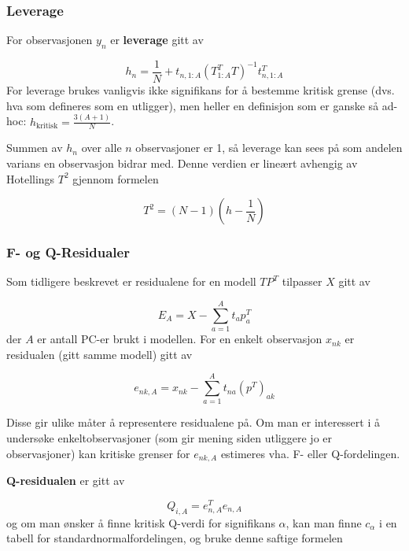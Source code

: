 \subsubsection{Leverage}
For observasjonen $y_n$ er \textbf{leverage} gitt av

\begin{equation}
	h_n = \frac{1}{N} + t_{n, 1:A} (T_{1:A}^T T)^{-1} t_{n, 1:A}^T
\end{equation}
For leverage brukes vanligvis ikke signifikans for å bestemme kritisk grense (dvs. hva som defineres som en utligger), men heller en definisjon som er ganske så ad-hoc: $h_{\textrm{kritisk}} = \frac{3(A+1)}{N}$.

Summen av $h_n$ over alle $n$ observasjoner er 1, så leverage kan sees på som andelen varians en observasjon bidrar med. Denne verdien er lineært avhengig av Hotellings $T^2$ gjennom formelen

\begin{equation}
	T^2 = (N-1) (h - \frac{1}{N})
\end{equation}

\subsubsection{F- og Q-Residualer}
Som tidligere beskrevet er residualene for en modell $T P^T$ tilpasser $X$ gitt av

\begin{equation}
	E_A = X - \sum_{a = 1}^A t_a p_a^T
\end{equation}
der $A$ er antall PC-er brukt i modellen. For en enkelt observasjon $x_{nk}$ er residualen (gitt samme modell) gitt av

\begin{equation}
	e_{nk, A} = x_{nk} - \sum_{a = 1}^A t_{na} (p^T)_{ak}
\end{equation}

Disse gir ulike måter å representere residualene på. Om man er interessert i å undersøke enkeltobservasjoner (som gir mening siden utliggere jo er observasjoner) kan kritiske grenser for $e_{nk, A}$ estimeres vha. F- eller Q-fordelingen. 

\textbf{Q-residualen} er gitt av

\begin{equation}
	Q_{i, A} = e_{n, A}^T e_{n, A}
\end{equation}
og om man ønsker å finne kritisk Q-verdi for signifikans $\alpha$, kan man finne $c_\alpha$ i en tabell for standardnormalfordelingen, og bruke denne saftige formelen

